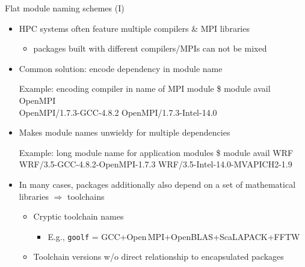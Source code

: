 \documentclass[10pt,xcolor={usenames,dvipsnames}]{beamer}
\begin{document}

\begin{frame}{Flat module naming schemes (I)}
\begin{itemize}
    \item
        HPC systems often feature multiple compilers \& MPI libraries
        \begin{itemize}
            \item
                packages built with different compilers/MPIs can not
                be mixed
        \end{itemize}
    \item
        Common solution: encode dependency in module name\\
        \enskip
        \begin{minipage}{0.9\textwidth}
            \begin{exampleblock}{Example: encoding compiler in name of MPI module}
                \ttfamily\small{
                \$ module avail OpenMPI\\
                OpenMPI/1.7.3-GCC-4.8.2
                    \quad OpenMPI/1.7.3-Intel-14.0}
            \end{exampleblock}
        \end{minipage}
    \smallskip
    \item
        Makes module names unwieldy for multiple dependencies\\
        \enskip
        \begin{minipage}{0.9\textwidth}
            \begin{exampleblock}{Example: long module name for application modules}
                \ttfamily\small{
                \$ module avail WRF\\
                WRF/3.5-GCC-4.8.2-OpenMPI-1.7.3
                    \quad WRF/3.5-Intel-14.0-MVAPICH2-1.9}
            \end{exampleblock}
        \end{minipage}
    \smallskip
    \item
        In many cases, packages additionally also depend on a set of
        mathematical libraries $\Rightarrow$ toolchains
        \begin{itemize}
            \item
                Cryptic toolchain names
                \begin{itemize}
                    \item
                        E.g., \texttt{goolf} = GCC+Open\,MPI+OpenBLAS+ScaLAPACK+FFTW
                \end{itemize}
            \item
                Toolchain versions w/o direct relationship to encapsulated packages
        \end{itemize}
\end{itemize}
\end{frame}
\end{document}
